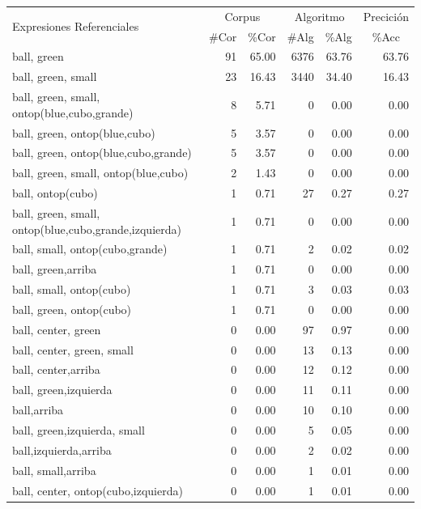 \begin{table}[H]
\begin{small}
\begin{center}
\begin{tabular}{|l|r|r|r|r|r|}
\hline
\multirow{2}{*}{Expresiones Referenciales} & \multicolumn{2}{|c|}{Corpus} & \multicolumn{2}{|c|}{Algoritmo} & Precici\'on \\ \cline{2-6} 
 & \#Cor & \multicolumn{1}{|c|}{\%Cor} & \multicolumn{1}{|c|}{\#Alg} & \multicolumn{1}{|c|}{\%Alg} & \multicolumn{1}{|c|}{\%Acc} \\
\hline
ball, green                                    & 91 & 65.00 & 6376 & 63.76 & 63.76 \\
ball, green, small                              & 23 & 16.43 & 3440 & 34.40 & 16.43 \\
ball, green, small, ontop(blue,cubo,grande)      &  8 &  5.71 &    0 &  0.00 &  0.00\\
ball, green, ontop(blue,cubo)                  &  5 &  3.57 &    0 &  0.00 &  0.00\\
ball, green, ontop(blue,cubo,grande)            &  5 &  3.57 &    0 &  0.00 &  0.00\\
ball, green, small, ontop(blue,cubo)            &  2 &  1.43 &    0 &  0.00 &  0.00\\
ball, ontop(cubo)                             &  1 &  0.71 &   27 &  0.27 &  0.27 \\
ball, green, small, ontop(blue,cubo,grande,izquierda) &  1 &  0.71 &    0 &  0.00 &  0.00\\
ball, small, ontop(cubo,grande)	              &  1 &  0.71 &    2 &  0.02 &  0.02 \\
ball, green,arriba                                &  1 &  0.71 &    0 &  0.00 &  0.00\\
ball, small, ontop(cubo)                       &  1 &  0.71 &    3 &  0.03 &  0.03 \\
ball, green, ontop(cubo)                       &  1 &  0.71 &    0 &  0.00 &  0.00\\
ball, center, green                              &  0 &  0.00 &   97 &  0.97 &  0.00\\
ball, center, green, small                        &  0 &  0.00 &   13 &  0.13 &  0.00\\
ball, center,arriba                                &  0 &  0.00 &   12 &  0.12 &  0.00\\
ball, green,izquierda	                              &  0 &  0.00 &   11 &  0.11 &  0.00\\
ball,arriba                                      &  0 &  0.00 &   10 &  0.10 &  0.00\\
ball, green,izquierda, small                         &  0 &  0.00 &    5 &  0.05 &  0.00\\
ball,izquierda,arriba                                 &  0 &  0.00 &    2 &  0.02 &  0.00\\
ball, small,arriba                                &  0 &  0.00 &    1 &  0.01 &  0.00\\
ball, center, ontop(cubo,izquierda)                  &  0 &  0.00 &    1 &  0.01 &  0.00\\


\end{tabular}
\end{center}
\end{small}
\end{table}
